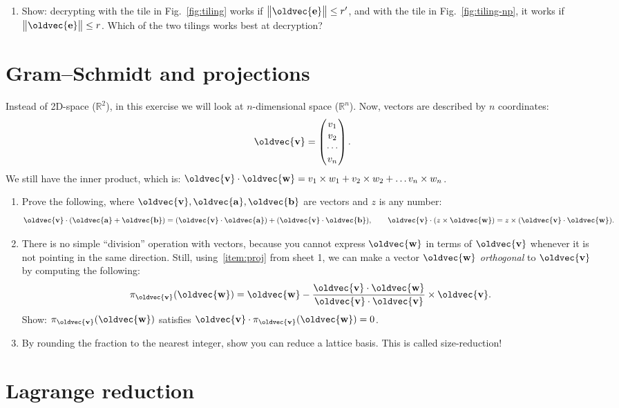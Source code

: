 \documentclass[10pt,a4paper]{article}
\renewcommand{\vec}[1]{\oldvec{\mathbf{#1}}}
\newcommand{\RR}{\mathbb{R}}
\DeclarePairedDelimiter{\norm}{\big\lVert}{\big\rVert}
\begin{document}
\begin{enumerate}[resume*]
	\item Show: decrypting with the tile in Fig.~\ref{fig:tiling}
	works if \(\norm{\vec{e}} \leq r'\),
	and with the tile in Fig.~\ref{fig:tiling-np}, it works if \(\norm{\vec{e}} \leq r\).
	Which of the two tilings works best at decryption?
\end{enumerate}

\clearpage
\section{Gram--Schmidt and projections}

Instead of 2D-space (\(\RR^2\)), in this exercise we will look at \(n\)-dimensional space (\(\RR^n\)).
Now, vectors are described by \(n\) coordinates:
\[
	\vec{v} = \begin{pmatrix} v_1 \\ v_2 \\ \cdots \\ v_n \end{pmatrix}.
\]
We still have the inner product, which is:
\(\vec{v} \cdot \vec{w} = v_1 \times w_1 + v_2 \times w_2 + \ldots v_n \times w_n\).

\begin{enumerate}
\item
	Prove the following, where \(\vec{v},\vec{a},\vec{b}\) are vectors and \(z\) is any number:
	\[
		\vec{v} \cdot (\vec{a} + \vec{b}) = (\vec{v} \cdot \vec{a}) + (\vec{v} \cdot \vec{b}),
		\qquad
		\vec{v} \cdot (z \times \vec{w}) = z \times (\vec{v} \cdot \vec{w}).
	\]

	\item
		There is no simple ``division'' operation with vectors, because you cannot express \(\vec{w}\) in terms of \(\vec{v}\) whenever it is not pointing in the same direction.
	Still, using~\ref{item:proj} from sheet 1,
	we can make a vector \(\vec{w}\) \emph{orthogonal} to \(\vec{v}\) by computing the following:
	\[
		\pi_{\vec{v}}(\vec{w}) = \vec{w} - \frac{\vec{v} \cdot \vec{w}}{\vec{v} \cdot \vec{v}} \times \vec{v}.
	\]
	Show: \(\pi_{\vec{v}}(\vec{w})\) satisfies \(\vec{v} \cdot \pi_{\vec{v}}(\vec{w}) = 0\).

	\item
		By rounding the fraction to the nearest integer, show you can reduce a lattice basis.
		This is called size-reduction!
\end{enumerate}

\section{Lagrange reduction}
\end{document}
